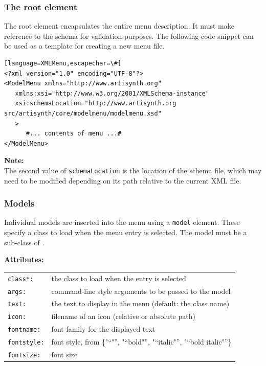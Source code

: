 \documentclass{article}
\newcommand{\openquot}{\iflatexml"\else``\fi}
\newcommand{\closequot}{\iflatexml"\else''\fi}
\newcommand{\quot}[1]{\openquot#1\closequot}
\begin{document}
\subsubsection{The root element}

The root element encapsulates the entire menu description.  It must make 
reference to the schema for validation purposes.  The following code snippet
can be used as a template for creating a new menu file.
\begin{lstlisting}[][language=XMLMenu,escapechar=\#]
<?xml version="1.0" encoding="UTF-8"?>
<ModelMenu xmlns="http://www.artisynth.org"
   xmlns:xsi="http://www.w3.org/2001/XMLSchema-instance"
   xsi:schemaLocation="http://www.artisynth.org src/artisynth/core/modelmenu/modelmenu.xsd"
   >
      #... contents of menu ...#
</ModelMenu>
\end{lstlisting}

\begin{sideblock}
{\bf Note:}\\
The second value of {\tt schemaLocation} is the location of the schema file, 
which may need to be modified depending on its path relative to the current 
XML file.
\end{sideblock}

\subsubsection{Models}

Individual models are inserted into the menu using a {\tt model} element.
These specify a class to load when the menu entry is selected.  The model
must be a sub-class of .  

\noindent \textbf{Attributes:}\\
\begin{tabular}{ll}
   {\tt class*:} & the class to load when the entry is selected\\
   {\tt args:} & command-line style arguments to be passed to the model\\
   {\tt text:} & the text to display in the menu (default: the class name)\\
   {\tt icon:} & filename of an icon (relative or absolute path)\\
   {\tt fontname:} & font family for the displayed text\\
   {\tt fontstyle:} & font style, from \{\quot{}, \quot{bold}, \quot{italic},
      \quot{bold italic}\}\\
   {\tt fontsize:} & font size
\end{tabular}
\end{document}
